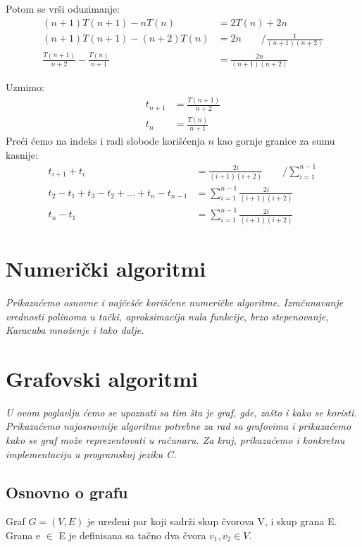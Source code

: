 \documentclass{memoir}
\begin{document}
Potom se vrši oduzimanje:
\begin{align*}
(n+1)T(n+1) - nT(n) &= 2T(n) + 2n	\\
(n+1)T(n+1) - (n+2)T(n) &= 2n \qquad / \frac{1}{(n+1)(n+2)}	\\
\frac{T(n+1)}{n+2} - \frac{T(n)}{n+1} &= \frac{2n}{(n+1)(n+2)}
\end{align*}

Uzmimo:
\begin{align*}
t_{n+1} &= \frac{T(n+1)}{n+2} \\
t_n &= \frac{T(n)}{n+1}
\end{align*}
Preći ćemo na indeks i radi slobode korišćenja $n$ kao gornje granice za sumu kasnije:
\begin{align*}
t_{i+1} + t_i &= \frac{2i}{(i+1)(i+2)} \qquad / \sum \limits_{i=1}^{n-1}	\\
t_2 - t_1 + t_3 - t_2 + ... + t_n - t_{n-1} &= \sum \limits_{i=1}^{n-1} \frac{2i}{(i+1)(i+2)}	\\
t_n - t_1 &= \sum \limits_{i=1}^{n-1} \frac{2i}{(i+1)(i+2)} 
\end{align*}
\chapter{Numerički algoritmi}
\emph{Prikazaćemo osnovne i najčešće korišćene numeričke algoritme. Izračunavanje vrednosti polinoma u tački,
aproksimacija nula funkcije, brzo stepenovanje, Karacuba množenje i tako dalje.}
\newpage

\chapter{Grafovski algoritmi}
\emph{U ovom poglavlju ćemo se upoznati sa tim šta je graf, gde, zašto i kako se koristi. Prikazaćemo najosnovnije 
algoritme potrebne za rad sa grafovima i prikazaćemo kako se graf može reprezentovati u računaru. Za kraj, prikazaćemo 
i konkretnu implementaciju u programskoj jeziku C.}
\newpage

\section{Osnovno o grafu}
\begin{definicija}
 Graf $ G=(V,E) $ je uređeni par koji sadrži skup čvorova V, i skup grana E.
 Grana e $\in$ E je definisana sa tačno dva čvora $ v_1, v_2 \in V $.
\end{definicija}
\end{document}
